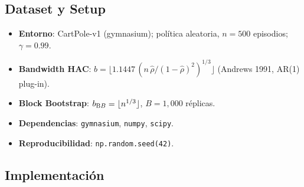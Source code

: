 \subsection*{Dataset y Setup}

\begin{itemize}
  \item \textbf{Entorno}: CartPole-v1 (gymnasium); política aleatoria,
    $n=500$ episodios; $\gamma=0.99$.
  \item \textbf{Bandwidth HAC}: $b = \lfloor 1.1447\,(n\,\hat\rho/(1-\hat\rho)^2)^{1/3}\rfloor$
    (Andrews 1991, AR(1) plug-in).
  \item \textbf{Block Bootstrap}: $b_{\textrm BB} = \lfloor n^{1/3} \rfloor$, $B=1{,}000$ réplicas.
  \item \textbf{Dependencias}: \texttt{gymnasium}, \texttt{numpy}, \texttt{scipy}.
  \item \textbf{Reproducibilidad}: \texttt{np.random.seed(42)}.
\end{itemize}

\subsection*{Implementación}

